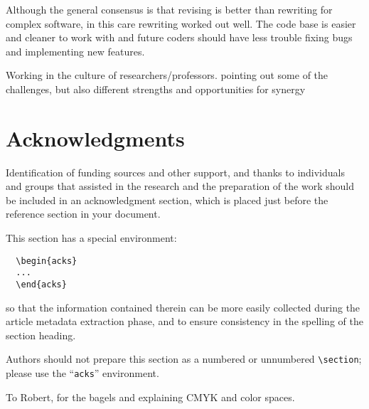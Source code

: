 \documentclass[acmtog, authorversion]{acmart}
\begin{document}
Although the general consensus is that revising is better than rewriting for complex software, in this care rewriting worked out well. The code base is easier and cleaner to work with and future coders should have less trouble fixing bugs and implementing new features.

Working in the culture of researchers/professors. pointing out some of the challenges, but also different strengths and opportunities for synergy

\section{Acknowledgments}

Identification of funding sources and other support, and thanks to
individuals and groups that assisted in the research and the
preparation of the work should be included in an acknowledgment
section, which is placed just before the reference section in your
document.

This section has a special environment:
\begin{verbatim}
  \begin{acks}
  ...
  \end{acks}
\end{verbatim}
so that the information contained therein can be more easily collected
during the article metadata extraction phase, and to ensure
consistency in the spelling of the section heading.

Authors should not prepare this section as a numbered or unnumbered {\verb|\section|}; please use the ``{\verb|acks|}'' environment.

\begin{acks}
To Robert, for the bagels and explaining CMYK and color spaces.
\end{acks}




\appendix
\end{document}
